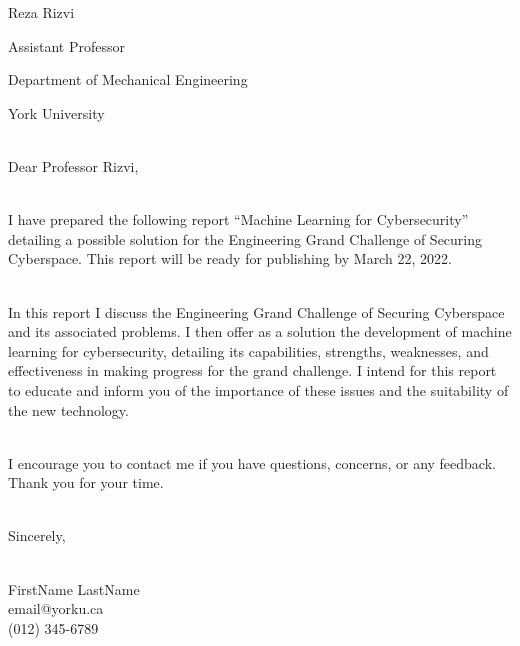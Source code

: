 
\noindent
Reza Rizvi

\noindent
Assistant Professor

\noindent
Department of Mechanical Engineering

\noindent
York University

\noindent
\\Dear Professor Rizvi,

\noindent
\\I have prepared the following report ``Machine Learning for Cybersecurity'' detailing a possible solution for the Engineering Grand Challenge of Securing Cyberspace.
This report will be ready for publishing by March 22, 2022.

\noindent
\\In this report I discuss the Engineering Grand Challenge of Securing Cyberspace and its associated problems.
I then offer as a solution the development of machine learning for cybersecurity, detailing its capabilities, strengths, weaknesses, and effectiveness in making progress for the grand challenge.
I intend for this report to educate and inform you of the importance of these issues and the suitability of the new technology.

\noindent
\\I encourage you to contact me if you have questions, concerns, or any feedback.
Thank you for your time.

\noindent
\\Sincerely,

\noindent
\\FirstName LastName
\\email@yorku.ca
\\(012) 345-6789
